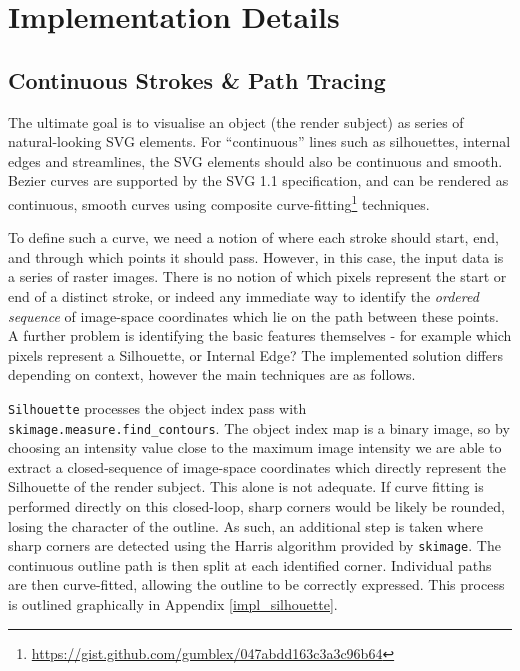 {\section{Implementation Details}

\subsection{Continuous Strokes \& Path Tracing}

The ultimate goal is to visualise an object (the render subject) as series of natural-looking SVG elements.
For ``continuous'' lines such as silhouettes, internal edges and streamlines, the SVG elements should also be continuous and smooth.
Bezier curves are supported by the SVG 1.1 specification, and can be rendered as continuous, smooth curves using composite curve-fitting\footnote{\url{https://gist.github.com/gumblex/047abdd163c3a3c96b64}} techniques.

To define such a curve, we need a notion of where each stroke should start, end, and through which points it should pass.
However, in this case, the input data is a series of raster images.
There is no notion of which pixels represent the start or end of a distinct stroke, or indeed any immediate way to identify the \emph{ordered sequence} of image-space coordinates which lie on the path between these points. A further problem is identifying the basic features themselves - for example which pixels represent a Silhouette, or Internal Edge? The implemented solution differs depending on context, however the main techniques are as follows.

\texttt{Silhouette} processes the object index pass with \texttt{skimage.measure.find\_contours}.
The object index map is a binary image, so by choosing an intensity value close to the maximum image intensity we are able to extract a closed-sequence of image-space coordinates which directly represent the Silhouette of the render subject.
This alone is not adequate.
If curve fitting is performed directly on this closed-loop, sharp corners would be likely be rounded, losing the character of the outline.
As such, an additional step is taken where sharp corners are detected using the Harris algorithm provided by \texttt{skimage}.
The continuous outline path is then split at each identified corner. Individual paths are then curve-fitted, allowing the outline to be correctly expressed.
This process is outlined graphically in Appendix \ref{impl_silhouette}.

}

